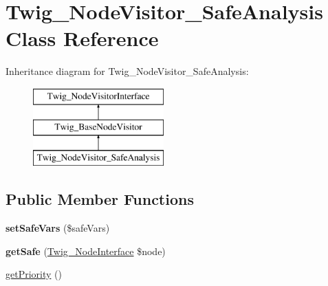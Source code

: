 \hypertarget{classTwig__NodeVisitor__SafeAnalysis}{}\section{Twig\+\_\+\+Node\+Visitor\+\_\+\+Safe\+Analysis Class Reference}
\label{classTwig__NodeVisitor__SafeAnalysis}
Inheritance diagram for Twig\+\_\+\+Node\+Visitor\+\_\+\+Safe\+Analysis\+:\begin{figure}[H]
\begin{center}
\leavevmode
\includegraphics[height=3.000000cm]{classTwig__NodeVisitor__SafeAnalysis}
\end{center}
\end{figure}
\subsection*{Public Member Functions}
\begin{DoxyCompactItemize}
\item 
{\bfseries set\+Safe\+Vars} (\$safe\+Vars)\hypertarget{classTwig__NodeVisitor__SafeAnalysis_a0d5500745ba86ed5fc09783f8d5d9d1e}{}\label{classTwig__NodeVisitor__SafeAnalysis_a0d5500745ba86ed5fc09783f8d5d9d1e}

\item 
{\bfseries get\+Safe} (\hyperlink{interfaceTwig__NodeInterface}{Twig\+\_\+\+Node\+Interface} \$node)\hypertarget{classTwig__NodeVisitor__SafeAnalysis_a9db8d1673b22c76f1edcc8e51249f911}{}\label{classTwig__NodeVisitor__SafeAnalysis_a9db8d1673b22c76f1edcc8e51249f911}

\item 
\hyperlink{classTwig__NodeVisitor__SafeAnalysis_a865947930f740151aa942d5ca15fefcb}{get\+Priority} ()
\end{DoxyCompactItemize}
